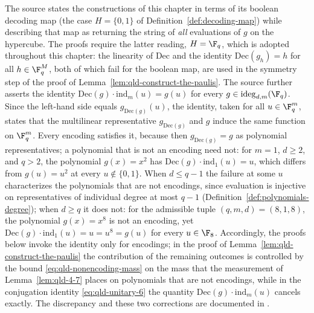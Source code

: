 \begin{remark}\label{rem:qld-decoding-identity}
	The source states the constructions of this chapter in terms of its boolean decoding map (the case $H = \{0,1\}$ of Definition~\ref{def:decoding-map}) while describing that map as returning the string of \emph{all} evaluations of $g$ on the hypercube. The proofs require the latter reading, $H = \F_q$, which is adopted throughout this chapter: the linearity of $\mathrm{Dec}$ and the identity $\mathrm{Dec}(g_h) = h$ for all $h \in \F_q^{M}$, both of which fail for the boolean map, are used in the symmetry step of the proof of Lemma~\ref{lem:qld-construct-the-paulis}. The source further asserts the identity $\mathrm{Dec}(g) \cdot \mathrm{ind}_m(u) = g(u)$ for every $g \in \mathrm{ideg}_{d,m}(\F_q)$. Since the left-hand side equals $g_{\mathrm{Dec}(g)}(u)$, the identity, taken for all $u \in \F_q^m$, states that the multilinear representative $g_{\mathrm{Dec}(g)}$ and $g$ induce the same function on $\F_q^m$. Every encoding satisfies it, because then $g_{\mathrm{Dec}(g)} = g$ as polynomial representatives; a polynomial that is not an encoding need not: for $m = 1$, $d \geq 2$, and $q > 2$, the polynomial $g(x) = x^2$ has $\mathrm{Dec}(g) \cdot \mathrm{ind}_1(u) = u$, which differs from $g(u) = u^2$ at every $u \notin \{0,1\}$. When $d \leq q-1$ the failure at some $u$ characterizes the polynomials that are not encodings, since evaluation is injective on representatives of individual degree at most $q-1$ (Definition~\ref{def:polynomials-degree}); when $d \geq q$ it does not: for the admissible tuple $(q,m,d) = (8,1,8)$, the polynomial $g(x) = x^8$ is not an encoding, yet $\mathrm{Dec}(g) \cdot \mathrm{ind}_1(u) = u = u^8 = g(u)$ for every $u \in \F_8$. Accordingly, the proofs below invoke the identity only for encodings; in the proof of Lemma~\ref{lem:qld-construct-the-paulis} the contribution of the remaining outcomes is controlled by the bound \eqref{eq:qld-nonencoding-mass} on the mass that the measurement of Lemma~\ref{lem:qld-4-7} places on polynomials that are not encodings, while in the conjugation identity \eqref{eq:qld-unitary-6} the quantity $\mathrm{Dec}(g) \cdot \mathrm{ind}_m(u)$ cancels exactly.
	The discrepancy and these two corrections are documented in
	\cite{gap:qpbt_decoding-identity}.
\end{remark}

